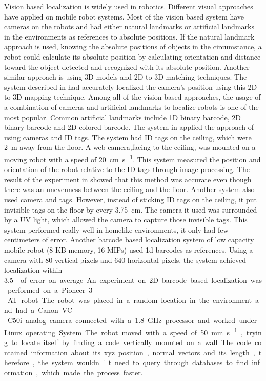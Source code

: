 \documentclass{article}
\begin{document}
		Vision based localization is widely used in robotics. Different visual approaches have applied on mobile robot systems. Most of the vision based system have cameras on the robots and had either natural landmarks or artificial landmarks in the environments as references to absolute positions. If the natural landmark approach is used, knowing the absolute positions of objects in the circumstance, a robot could calculate its absolute position by calculating orientation and distance toward the object detected and recognized with its absolute position. Another similar approach is using 3D models and 2D to 3D matching techniques. The system described in \cite{sattler_fast_2011} had accurately localized the camera's position using this 2D to 3D mapping technique. Among all of the vision based approaches, the usage of a combination of cameras and artificial landmarks to localize robots is one of the most popular. Common artificial landmarks include 1D binary barcode, 2D binary barcode and 2D colored barcode. The system in \cite{lin_localization_2004} applied the approach of using cameras and ID tags. The system had ID tags on the ceiling, which were \SI{2}{\meter} away from the floor. A web camera,facing to the ceiling, was mounted on a moving robot with a speed of \SI{20}{\centi\meter\per\second}. This system measured the position and orientation of the robot relative to the ID tags through image processing. The result of the experiment in \cite{lin_localization_2004} showed that this method was accurate even though there was an unevenness between the ceiling and the floor. Another system \cite{huh_mobile_2007} also used camera and tags. However, instead of sticking ID tags on the ceiling, it put invisible tags on the floor by every \SI{3.75}{\centi\meter}. The camera it used was surrounded by a UV light, which allowed the camera to capture those invisible tags. This system performed really well in homelike environments, it only had few centimeters of error. Another barcode based localization system of low capacity mobile robot (8 KB memory, 16 MIPs) \cite{dias_barcode-based_2012} used 1d barcodes as references. Using a camera with 80 vertical pixels and 640 horizontal pixels, the system achieved localization within \SI{3.5}{\meter\per\second\square} of error on average. An experiment on 2D barcode based localization was performed on a Pioneer 3 - AT robot. The robot was placed in a random location in the environment and had a Canon VC-C50i analog camera connected with a \SI{1.8}{\giga\hertz} processor and worked under Linux operating System. The robot moved with a speed of \SI{50}{\milli\meter\per\second}, trying to locate itself by finding a code vertically mounted on a wall. The code contained information about its xyz position, normal vectors and its length, therefore, the system wouldn't need to query through databases to find information, which made the process faster.
\end{document}
